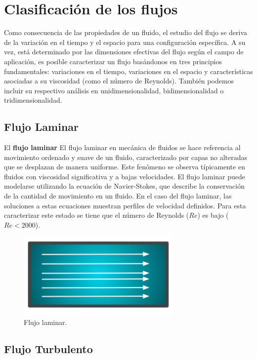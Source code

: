 \documentclass[10pt, oneside]{article}
\begin{document}
\section{Clasificación de los flujos}

Como consecuencia de las propiedades de un fluido, el estudio del flujo se deriva de la variación en el tiempo y el espacio para una configuración específica. A su vez, está determinado por las dimensiones efectivas del flujo según el campo de aplicación, es posible caracterizar un flujo basándonos en tres principios fundamentales: variaciones en el tiempo, variaciones en el espacio y características asociadas a su viscosidad (como el número de Reynolds). También podemos incluir su respectivo análisis en unidimensionalidad, bidimensionalidad o tridimensionalidad.

\subsection{Flujo Laminar}

El \textbf{flujo laminar} El flujo laminar en mecánica de fluidos se hace referencia al movimiento ordenado y suave de un fluido, caracterizado por capas no alteradas que se desplazan de manera uniforme. Este fenómeno se observa típicamente en fluidos con viscosidad significativa y a bajas velocidades. El flujo laminar puede modelarse utilizando la ecuación de Navier-Stokes, que describe la conservación de la cantidad de movimiento en un fluido. En el caso del flujo laminar, las soluciones a estas ecuaciones muestran perfiles de velocidad definidos. Para esta caracterizar este estado se tiene que el número de Reynolds ($Re$) es bajo ($Re < 2000$).

\begin{figure}[h]
\centering
\includegraphics[width=8cm]{Fig.7.jpg}
\caption{Flujo laminar.}
\label{tmove}
\end{figure}

\subsection{Flujo Turbulento}
\end{document}
